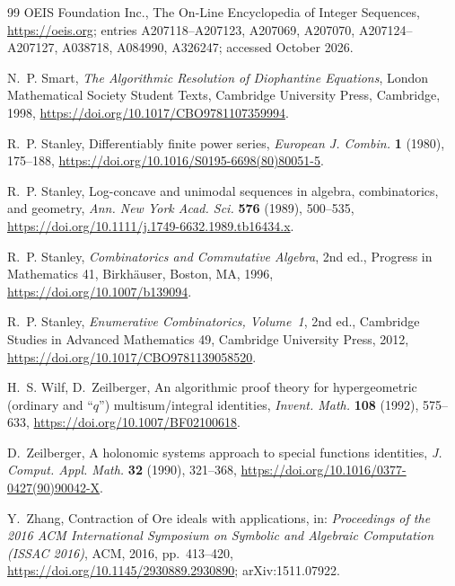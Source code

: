 \documentclass[11pt]{amsart}
\theoremstyle{definition}
\begin{document}
\begin{thebibliography}{99}
OEIS Foundation Inc., The On-Line Encyclopedia of Integer Sequences, \url{https://oeis.org}; entries A207118--A207123, A207069, A207070, A207124--A207127, A038718, A084990, A326247; accessed October 2026.

N.~P. Smart, \emph{The Algorithmic Resolution of Diophantine Equations}, London Mathematical Society Student Texts, Cambridge University Press, Cambridge, 1998, \url{https://doi.org/10.1017/CBO9781107359994}.

R.~P. Stanley, Differentiably finite power series, \emph{European J. Combin.} \textbf{1} (1980), 175--188, \url{https://doi.org/10.1016/S0195-6698(80)80051-5}.

R.~P. Stanley, Log-concave and unimodal sequences in algebra, combinatorics, and geometry, \emph{Ann. New York Acad. Sci.} \textbf{576} (1989), 500--535, \url{https://doi.org/10.1111/j.1749-6632.1989.tb16434.x}.

R.~P. Stanley, \emph{Combinatorics and Commutative Algebra}, 2nd ed., Progress in Mathematics 41, Birkh\"auser, Boston, MA, 1996, \url{https://doi.org/10.1007/b139094}.

R.~P. Stanley, \emph{Enumerative Combinatorics, Volume~1}, 2nd ed., Cambridge Studies in Advanced Mathematics 49, Cambridge University Press, 2012, \url{https://doi.org/10.1017/CBO9781139058520}.

H.~S. Wilf, D.~Zeilberger, An algorithmic proof theory for hypergeometric (ordinary and ``$q$'') multisum/integral identities, \emph{Invent. Math.} \textbf{108} (1992), 575--633, \url{https://doi.org/10.1007/BF02100618}.

D.~Zeilberger, A holonomic systems approach to special functions identities, \emph{J. Comput. Appl. Math.} \textbf{32} (1990), 321--368, \url{https://doi.org/10.1016/0377-0427(90)90042-X}.

Y.~Zhang, Contraction of Ore ideals with applications, in: \emph{Proceedings of the 2016 ACM International Symposium on Symbolic and Algebraic Computation (ISSAC 2016)}, ACM, 2016, pp.~413--420, \url{https://doi.org/10.1145/2930889.2930890}; arXiv:1511.07922.

\end{thebibliography}
\end{document}
